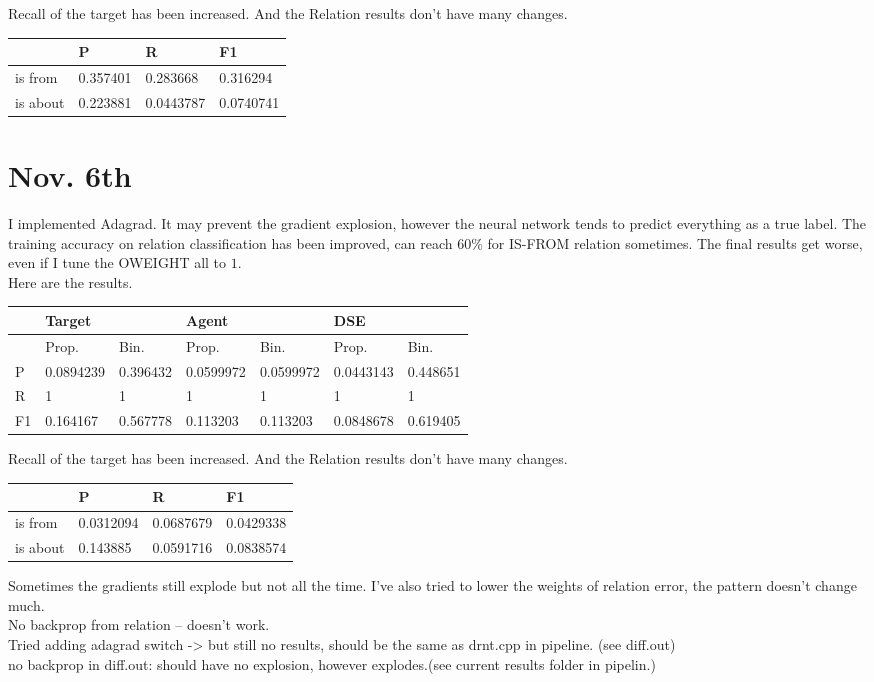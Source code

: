 \documentclass[a4paper, 12pt]{article}
\begin{document}
Recall of the target has been increased.
And the Relation results don't have many changes.
\begin{table}[h!]
\centering
\begin{tabular}{l|l|l|l}
\hline
         & P & R & F1    \\\hline
is from  & 0.357401& 0.283668& 0.316294 \\
is about & 0.223881& 0.0443787& 0.0740741\\
\hline
\end{tabular}
\end{table}

\section{Nov. 6th}

I implemented Adagrad. It may prevent the gradient explosion, however the neural network tends 
to predict everything as a true label. The training accuracy on relation classification has been improved, can reach 60\% for IS-FROM relation sometimes. The final results get worse, even if 
I tune the OWEIGHT all to $1$.\\
Here are the results.
\begin{table}[h!]
\centering
\begin{tabular}{l|ll|ll|ll}
\hline
   & \multicolumn{2}{l}{Target} & \multicolumn{2}{l}{Agent} & \multicolumn{2}{l}{DSE} \\ \hline
   & Prop.& Bin.& Prop.& Bin.& Prop.& Bin.\\
 \hline
P  &0.0894239&0.396432 &0.0599972 & 0.0599972 &0.0443143 & 0.448651  \\
R  &        1&       1 &        1 &         1 &        1 &        1  \\
F1 & 0.164167&0.567778 & 0.113203 &  0.113203 &0.0848678 & 0.619405  \\ \hline
\end{tabular}
\end{table}

Recall of the target has been increased.
And the Relation results don't have many changes.
\begin{table}[h!]
\centering
\begin{tabular}{l|l|l|l}
\hline
         & P & R & F1    \\\hline
is from  & 0.0312094& 0.0687679& 0.0429338\\
is about & 0.143885& 0.0591716& 0.0838574\\
\hline
\end{tabular}
\end{table}

Sometimes the gradients still explode but not all the time. I've also tried to lower the weights of relation error, the pattern doesn't change much.\\

No backprop from relation -- doesn't work.\\
Tried adding adagrad switch -> but still no results, should be the same as
drnt.cpp in pipeline. (see diff.out) \\
no backprop in diff.out: should have no explosion, however explodes.(see
current results folder in pipelin.)
\end{document}
